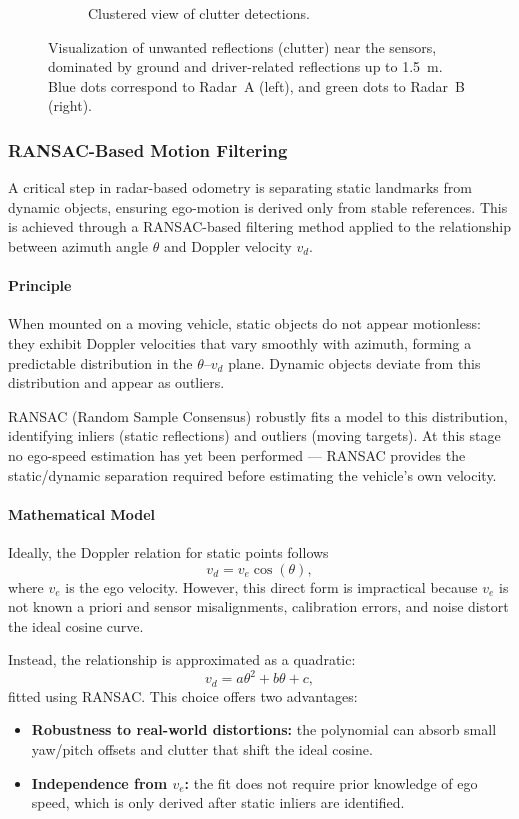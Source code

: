 \begin{figure}[!htbp]
\begin{subfigure}{0.45\linewidth}
        \caption{Clustered view of clutter detections.}
        \label{fig:clutter_clustered}
    \end{subfigure}
    \caption{Visualization of unwanted reflections (clutter) near the sensors, dominated by ground and driver-related reflections up to \SI{1.5}{\meter}.  
    Blue dots correspond to Radar~A (left), and green dots to Radar~B (right).}
    \label{fig:filter_example}
\end{figure}


\FloatBarrier


\subsubsection{RANSAC-Based Motion Filtering}

A critical step in radar-based odometry is separating static landmarks from dynamic objects, ensuring ego-motion is derived only from stable references.  
This is achieved through a RANSAC-based filtering method applied to the relationship between azimuth angle $\theta$ and Doppler velocity $v_d$.

\paragraph{Principle}
When mounted on a moving vehicle, static objects do not appear motionless: they exhibit Doppler velocities that vary smoothly with azimuth, forming a predictable distribution in the $\theta$–$v_d$ plane.  
Dynamic objects deviate from this distribution and appear as outliers.  

RANSAC (Random Sample Consensus) robustly fits a model to this distribution, identifying inliers (static reflections) and outliers (moving targets).  
At this stage no ego-speed estimation has yet been performed — RANSAC provides the static/dynamic separation required before estimating the vehicle’s own velocity.

\paragraph{Mathematical Model}
Ideally, the Doppler relation for static points follows
\[
v_d = v_e \cos(\theta),
\]
where $v_e$ is the ego velocity.  
However, this direct form is impractical because $v_e$ is not known a priori and sensor misalignments, calibration errors, and noise distort the ideal cosine curve.  

Instead, the relationship is approximated as a quadratic:
\[
v_d = a\theta^2 + b\theta + c,
\]
fitted using RANSAC.  
This choice offers two advantages:
\begin{itemize}
    \item \textbf{Robustness to real-world distortions:} the polynomial can absorb small yaw/pitch offsets and clutter that shift the ideal cosine.
    \item \textbf{Independence from $v_e$:} the fit does not require prior knowledge of ego speed, which is only derived after static inliers are identified.
\end{itemize}

